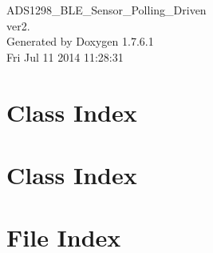 \documentclass[a4paper]{book}
\begin{document}
\hypersetup{pageanchor=false,citecolor=blue}
\begin{titlepage}
\vspace*{7cm}
\begin{center}
{\Large \-A\-D\-S1298\-\_\-\-B\-L\-E\-\_\-\-Sensor\-\_\-\-Polling\-\_\-\-Driven \\[1ex]\large ver2. }\\
\vspace*{1cm}
{\large \-Generated by Doxygen 1.7.6.1}\\
\vspace*{0.5cm}
{\small Fri Jul 11 2014 11:28:31}\\
\end{center}
\end{titlepage}
\clearemptydoublepage
{}
\tableofcontents
\clearemptydoublepage
{}
\hypersetup{pageanchor=true,citecolor=blue}
\chapter{\-Class \-Index}

\chapter{\-Class \-Index}

\chapter{\-File \-Index}

\end{document}
